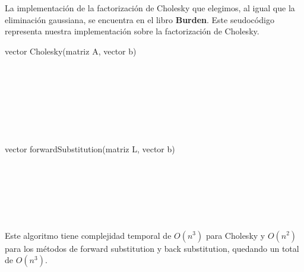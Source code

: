 La implementación de la factorización de Cholesky que elegimos, al igual que la eliminación gaussiana, se encuentra en el libro \textbf{Burden}.
Este seudocódigo representa nuestra implementación sobre la factorización de Cholesky.

\begin{algorithm}
    \begin{algorithmic}[1]\parskip=2mm
        \caption{vector Cholesky(matriz A, vector b)}
        \\
        \\
        \\
        \\
        \\
        \\
    \end{algorithmic}
\end{algorithm}

\begin{algorithm}
    \begin{algorithmic}[1]\parskip=2mm
        \caption{vector forwardSubstitution(matriz L, vector b)}
        \\ 
        \\
        \\
        \\
        \\
      \end{algorithmic}
\end{algorithm}

Este algoritmo tiene complejidad temporal de $O(n^3)$ para Cholesky y $O(n^2)$ para los métodos de forward substitution y back substitution, quedando un total de $O(n^3)$.

\newpage
